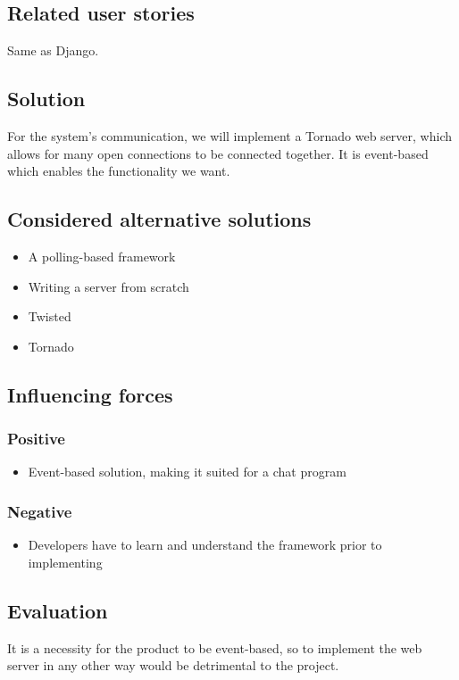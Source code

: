\documentclass[12pt, a4paper]{article}
\begin{document}
\subsection{Related user stories}
Same as Django.
\subsection{Solution}
For the system's communication, we will implement a Tornado web server, which allows for many open connections to be connected together. It is event-based which enables the functionality we want.
\subsection{Considered alternative solutions}
\begin{itemize}
    \item A polling-based framework
    \item Writing a server from scratch
    \item Twisted
    \item Tornado
\end{itemize}
\subsection{Influencing forces}
\begin{minipage}[t]{0.5\textwidth}
    \subsubsection*{Positive}
    \begin{itemize}
        \item Event-based solution, making it suited for a chat program
    \end{itemize}
\end{minipage}%
\begin{minipage}[t]{0.5\textwidth}
    \subsubsection*{Negative}
    \begin{itemize}
        \item Developers have to learn and understand the framework prior to implementing
    \end{itemize}
\end{minipage}
\subsection{Evaluation}
It is a necessity for the product to be event-based, so to implement the web server in any other way would be detrimental to the project.
\end{document}
